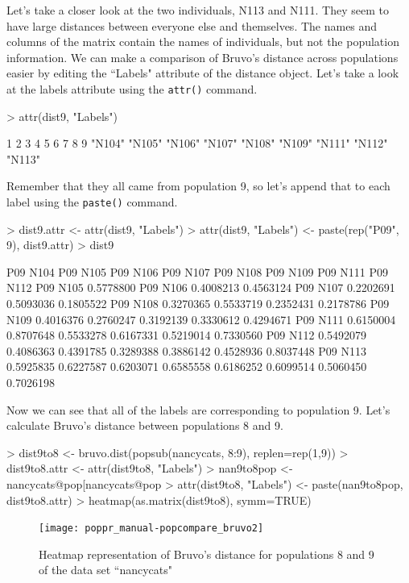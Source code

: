 \documentclass[letterpaper]{article}
\begin{document}
Let's take a closer look at the two individuals, N113 and N111. They seem to have large distances between everyone else and themselves. The names and columns of the matrix contain the names of individuals, but not the population information. We can make a comparison of Bruvo's distance across populations easier by editing the ``Labels" attribute of the distance object. Let's take a look at the labels attribute using the \texttt{attr()} command. 
\begin{Schunk}
\begin{Sinput}
> attr(dist9, "Labels")
\end{Sinput}
\begin{Soutput}
     1      2      3      4      5      6      7      8      9 
"N104" "N105" "N106" "N107" "N108" "N109" "N111" "N112" "N113" 
\end{Soutput}
\end{Schunk}
Remember that they all came from population 9, so let's append that to each label using the \texttt{paste()} command. 
\begin{Schunk}
\begin{Sinput}
> dist9.attr <- attr(dist9, "Labels")
> attr(dist9, "Labels") <- paste(rep("P09", 9), dist9.attr)
> dist9
\end{Sinput}
\begin{Soutput}
          P09 N104  P09 N105  P09 N106  P09 N107  P09 N108  P09 N109  P09 N111  P09 N112
P09 N105 0.5778800                                                                      
P09 N106 0.4008213 0.4563124                                                            
P09 N107 0.2202691 0.5093036 0.1805522                                                  
P09 N108 0.3270365 0.5533719 0.2352431 0.2178786                                        
P09 N109 0.4016376 0.2760247 0.3192139 0.3330612 0.4294671                              
P09 N111 0.6150004 0.8707648 0.5533278 0.6167331 0.5219014 0.7330560                    
P09 N112 0.5492079 0.4086363 0.4391785 0.3289388 0.3886142 0.4528936 0.8037448          
P09 N113 0.5925835 0.6227587 0.6203071 0.6585558 0.6186252 0.6099514 0.5060450 0.7026198
\end{Soutput}
\end{Schunk}
Now we can see that all of the labels are corresponding to population 9. Let's calculate Bruvo's distance between populations 8 and 9.
\begin{Schunk}
\begin{Sinput}
> dist9to8 <- bruvo.dist(popsub(nancycats, 8:9), replen=rep(1,9))
> dist9to8.attr <- attr(dist9to8, "Labels")
> nan9to8pop <- nancycats@pop[nancycats@pop %
> attr(dist9to8, "Labels") <- paste(nan9to8pop, dist9to8.attr)
> heatmap(as.matrix(dist9to8), symm=TRUE)
\end{Sinput}
\end{Schunk}
\begin{figure}[h!]
  \centering
  \caption{\footnotesize Heatmap representation of Bruvo's distance for populations 8 and 9 of the data set ``nancycats"}
  \label{bruvo_heat_map_8to9}
\texttt{[image: poppr\_manual-popcompare\_bruvo2]}
\end{figure}
\end{document}
